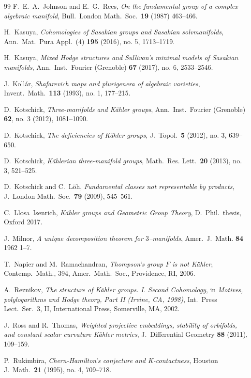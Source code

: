 \documentclass[12pt,leqno]{amsart}
\begin{document}
\begin{thebibliography}{99}
 F.~E.~A.~Johnson and E.~G.~Rees,
\emph{On the fundamental group of a complex algebraic manifold},
  Bull.~London Math.~Soc.~{\bf 19} (1987) 463--466.
 

   
 H.~Kasuya,
 \emph{Cohomologies of Sasakian groups and Sasakian solvmanifolds},
 Ann.~Mat.~Pura Appl.~(4) {\bf 195} (2016), no. 5, 1713--1719. 

 H.~Kasuya,
 \emph{Mixed Hodge structures and Sullivan's minimal models of Sasakian manifolds},
 Ann.~Inst.~Fourier (Grenoble) {\bf 67} (2017), no. 6, 2533--2546.

  
  J.~Koll\'ar,
  \emph{Shafarevich maps and plurigenera of algebraic varieties},
  Invent.~Math.~{\bf 113} (1993), no. 1, 177--215. 
  
  
D.~Kotschick,
\emph{Three-manifolds and K\"ahler groups}, Ann.~Inst.~Fourier (Grenoble) {\bf 62}, no. 3 (2012), 1081--1090.

D.~Kotschick,
\emph{The deficiencies of K\"ahler groups},  J.~Topol.~{\bf 5} (2012), no. 3, 639--650.

D.~Kotschick, \emph{K\"ahlerian three-manifold groups},  Math.~Res. Lett.~{\bf 20} (2013), no. 3, 521--525.

D.~Kotschick and C.~L\"oh, \emph{Fundamental classes not representable by products}, 
J.~London Math.~Soc.~{\bf 79} (2009), 545--561.

C.~Llosa~Isenrich, {\sl K\"ahler groups and Geometric Group Theory}, D.~Phil.~thesis, Oxford 2017.


J.~Milnor, \emph{A unique decomposition theorem for $3$--manifolds},   Amer.~J.~Math. {\bf 84} 1962 1--7.


 T.~Napier and M.~Ramachandran,
 \emph{Thompson's group $F$ is not K\"ahler},
 Contemp.~Math., 394, Amer.~Math.~Soc., Providence, RI, 2006.
 
 
 A.~Reznikov, \emph{The structure of K\"ahler groups. I. Second Cohomology}, in 
 {\sl Motives, polylogarithms and Hodge theory, Part II (Irvine, CA, 1998)}, 
 Int.~Press Lect.~Ser.~3, II, International Press, Somerville, MA, 2002. 
 
 J.~Ross and R.~Thomas,
 \emph{Weighted projective embeddings, stability of orbifolds, and constant scalar curvature K\"ahler 
 metrics}, J.~Differential Geometry {\bf 88} (2011), 109--159.
 
 P.~Rukimbira,
 \emph{Chern-Hamilton's conjecture and K-contactness},
  Houston J.~Math.~{\bf 21} (1995), no. 4, 709--718. 
  

\end{thebibliography}
\end{document}
